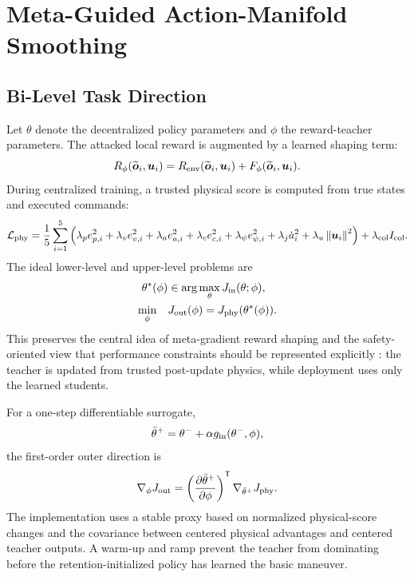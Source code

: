 \documentclass[lettersize,journal]{IEEEtran}
\newcommand{\vect}[1]{\boldsymbol{#1}}
\newcommand{\norm}[1]{\left\lVert #1\right\rVert}
\begin{document}
\section{Meta-Guided Action-Manifold Smoothing}
\subsection{Bi-Level Task Direction}
Let $\theta$ denote the decentralized policy parameters and $\phi$ the reward-teacher parameters. The attacked local reward is augmented by a learned shaping term:
\begin{equation}
R_{\phi}(\widetilde{\vect{o}}_i,\vect{u}_i)
=R_{\rm env}(\widetilde{\vect{o}}_i,\vect{u}_i)
 +F_{\phi}(\widetilde{\vect{o}}_i,\vect{u}_i).
\label{eq:shaped_reward}
\end{equation}
During centralized training, a trusted physical score is computed from true states and executed commands:
\begin{equation}
\mathcal{L}_{\rm phy}
=\frac{1}{5}\sum_{i=1}^{5}
\left(
\lambda_p e_{p,i}^2+
\lambda_v e_{v,i}^2+
\lambda_a e_{a,i}^2+
\lambda_c e_{c,i}^2+
\lambda_\psi e_{\psi,i}^2+
\lambda_j \dot{a}_i^2+
\lambda_u\norm{\vect{u}_i}^2
\right)
 +\lambda_{\rm col}I_{\rm col}.
\label{eq:physical_loss}
\end{equation}
The ideal lower-level and upper-level problems are
\begin{align}
\theta^*(\phi)&\in\arg\max_{\theta}J_{\rm in}(\theta;\phi),\\
\min_{\phi}\quad &J_{\rm out}(\phi)=J_{\rm phy}(\theta^*(\phi)).
\label{eq:bilevel}
\end{align}
This preserves the central idea of meta-gradient reward shaping \cite{xia2026security,finn2017model} and the safety-oriented view that performance constraints should be represented explicitly \cite{tessler2019reward}: the teacher is updated from trusted post-update physics, while deployment uses only the learned students.

For a one-step differentiable surrogate,
\begin{equation}
\bar{\theta}^{+}
=\theta^{-}+\alpha g_{\rm in}(\theta^{-},\phi),
\end{equation}
the first-order outer direction is
\begin{equation}
\nabla_{\phi}J_{\rm out}
=\left(\frac{\partial\bar{\theta}^{+}}{\partial\phi}\right)^{\mathsf T}
\nabla_{\bar{\theta}^{+}}J_{\rm phy}.
\label{eq:meta_gradient}
\end{equation}
The implementation uses a stable proxy based on normalized physical-score changes and the covariance between centered physical advantages and centered teacher outputs. A warm-up and ramp prevent the teacher from dominating before the retention-initialized policy has learned the basic maneuver.
\end{document}

